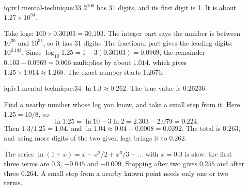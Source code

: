 \begin{solution}{iq:iv1:mental-technique:33}
$2^{100}$ has 31 digits, and its first digit is 1. It is about $1.27 \times 10^{30}$.

Take logs: $100 \times 0.30103 = 30.103$. The integer part says the number is between $10^{30}$ and $10^{31}$, so it has 31 digits. The fractional part gives the leading digits: $10^{0.103}$. Since $\log_{10} 1.25 = 1 - 3(0.30103) = 0.0969$, the remainder $0.103 - 0.0969 = 0.006$ multiplies by about $1.014$, which gives $1.25 \times 1.014 \approx 1.268$. The exact number starts $1.2676$.

\end{solution}

\begin{solution}{iq:iv1:mental-technique:34}
$\ln 1.3 \approx 0.262$. The true value is $0.26236$.

Find a nearby number whose log you know, and take a small step from it. Here $1.25 = 10/8$, so
\[
\ln 1.25 = \ln 10 - 3 \ln 2 = 2.303 - 2.079 = 0.224.
\]
Then $1.3 / 1.25 = 1.04$, and $\ln 1.04 \approx 0.04 - 0.0008 = 0.0392$. The total is $0.263$, and using more digits of the two given logs brings it to $0.262$.

The series $\ln(1 + x) = x - x^2/2 + x^3/3 - \dots$ with $x = 0.3$ is slow: the first three terms are $0.3$, $-0.045$ and $+0.009$. Stopping after two gives $0.255$ and after three $0.264$. A small step from a nearby known point needs only one or two terms.

\end{solution}

